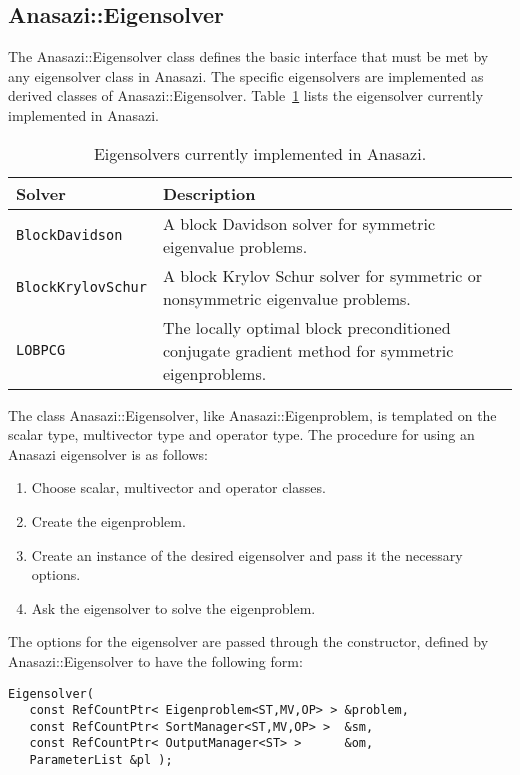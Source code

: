 \subsection{Anasazi::Eigensolver}
\label{sec:anasazi:eigensolver}

The Anasazi::Eigensolver class defines the basic interface that must be
met by any eigensolver class in Anasazi. The specific eigensolvers are
implemented as derived classes of Anasazi::Eigensolver.
Table~\ref{tab:anasazi:solvers} lists the eigensolver currently implemented in
Anasazi.

\begin{table}[htp]
\begin{center}
\begin{tabular}{| p{4cm} p{10cm} |}
\hline
Solver & Description \\
\hline
{\tt BlockDavidson}    & A block Davidson solver for symmetric
                         eigenvalue problems.\\
{\tt BlockKrylovSchur} & A block Krylov Schur solver for symmetric or
                         nonsymmetric eigenvalue problems.\\
{\tt LOBPCG} & The locally optimal block preconditioned conjugate gradient
method for symmetric eigenproblems.\\
\hline
\end{tabular}
\caption{Eigensolvers currently implemented in Anasazi.}
\label{tab:anasazi:solvers}
\end{center}
\end{table}

The class Anasazi::Eigensolver, like Anasazi::Eigenproblem, is
templated on the scalar type, multivector type and operator
type. The procedure for using an Anasazi eigensolver is as follows:
\begin{enumerate}
\item Choose scalar, multivector and operator classes.
\item Create the eigenproblem.
\item Create an instance of the desired eigensolver and pass it the necessary
options.
\item Ask the eigensolver to solve the eigenproblem.
\end{enumerate}

The options for the eigensolver are passed through the constructor, defined by
Anasazi::Eigensolver to have the following form:
\begin{verbatim}
Eigensolver( 
   const RefCountPtr< Eigenproblem<ST,MV,OP> > &problem, 
   const RefCountPtr< SortManager<ST,MV,OP> >  &sm,
   const RefCountPtr< OutputManager<ST> >      &om,
   ParameterList &pl );
\end{verbatim}

